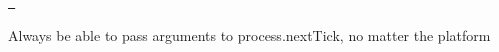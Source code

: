 \href{https://travis-ci.org/calvinmetcalf/process-nextick-args}{\texttt{ }}


\begin{DoxyCode}{0}
\end{DoxyCode}


Always be able to pass arguments to process.\+next\+Tick, no matter the platform


\begin{DoxyCode}{0}
\DoxyCodeLine{}
\end{DoxyCode}
 